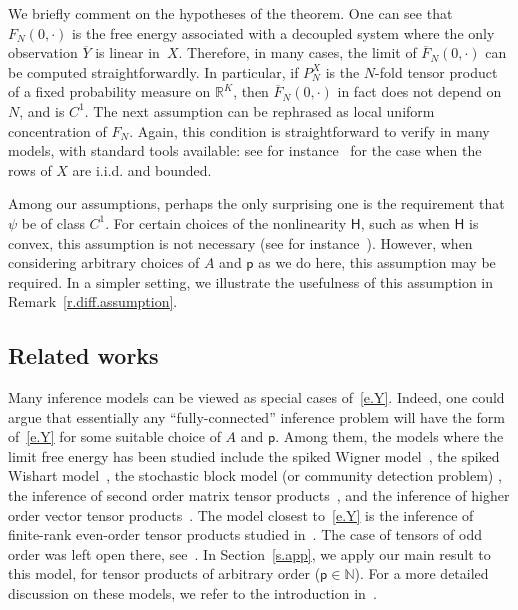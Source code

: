 \documentclass[10pt]{amsart}
\theoremstyle{definition}\newtheorem{defi}[theo]{Definition}\newtheorem{rema}[theo]{Remark}\newtheorem{exam}[theo]{Example}\newtheorem{exem}[theo]{Example}\newtheorem{nota}[theo]{Notation}
\newcommand{\N}{\mathbb{N}}
\newcommand{\R}{\mathbb{R}}
\renewcommand{\H}{\mathsf{H}}
\newcommand{\sfp}{\mathsf{p}}
\renewcommand{\bar}{\overline}
\begin{document}
We briefly comment on the hypotheses of the theorem. One can see that $F_N(0,\cdot)$ is the free energy associated with a decoupled system where the only observation $\bar Y$ is linear in~$X$. Therefore, in many cases, the limit of $\bar F_N(0,\cdot)$ can be computed straightforwardly. In particular, if $P_N^X$ is the $N$-fold tensor product of a fixed probability measure on $\R^K$, then $\bar F_N(0,\cdot)$ in fact does not depend on $N$, and is $C^1$. The next assumption can be rephrased as local uniform concentration of $F_N$. Again, this condition is straightforward to verify in many models, with standard tools available: see for instance~\cite[Lemma~C.1]{HBJ} for the case when the rows of $X$ are i.i.d. and bounded.

Among our assumptions, perhaps the only surprising one is the requirement that $\psi$ be of class $C^1$. For certain choices of the nonlinearity $\H$, such as when $\H$ is convex, this assumption is not necessary (see for instance~\cite{HBJ}). However, when considering arbitrary choices of $A$ and $\sfp$ as we do here, this assumption may be required. In a simpler setting, we illustrate the usefulness of this assumption in Remark~\ref{r.diff.assumption}.

\subsection{Related works} 
Many inference models can be viewed as special cases of~\eqref{e.Y}. Indeed, one could argue that essentially any ``fully-connected'' inference problem will have the form of~\eqref{e.Y} for some suitable choice of $A$ and $\sfp$. Among them, the models where the limit free energy has been studied include the spiked Wigner model~\cite{barbier2016, barbier2019adaptive,lelarge2019fundamental, mourrat2018hamilton, mourrat2019hamilton}, the spiked Wishart model~\cite{barbier2017layered,chen2020hamilton, kadmon2018statistical, luneau2020high,miolane2017fundamental}, the stochastic block model (or community detection problem) \cite{lelarge2019fundamental, mayya2019mutualIEEE, reeves2019geometryIEEE}, the inference of second order matrix tensor products~\cite{reeves2020information}, and the inference of higher order vector tensor products~\cite{barbier2019adaptive,lesieur2017statistical, mourrat2018hamilton}. The model closest to~\eqref{e.Y} is the inference of finite-rank even-order tensor products studied in~\cite{luneau2019mutual}. The case of tensors of odd order was left open there, see~\cite[Section~7]{luneau2019mutual}. In Section~\ref{s.app}, we apply our main result to this model, for tensor products of arbitrary order ($\sfp \in \N$). For a more detailed discussion on these models, we refer to the introduction in~\cite{HBJ}.
\end{document}
